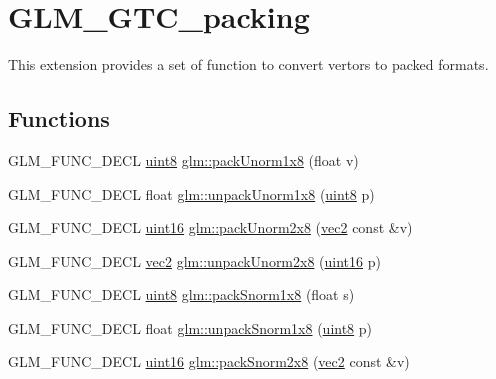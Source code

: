 \hypertarget{group__gtc__packing}{}\section{G\+L\+M\+\_\+\+G\+T\+C\+\_\+packing}
\label{group__gtc__packing}


This extension provides a set of function to convert vertors to packed formats.  


\subsection*{Functions}
\begin{DoxyCompactItemize}
\item 
G\+L\+M\+\_\+\+F\+U\+N\+C\+\_\+\+D\+E\+CL \hyperlink{group__gtc__type__precision_ga1a7dcd8aac97cc8020817c94049deff2}{uint8} \hyperlink{group__gtc__packing_ga2f9963e5d762b10085b280d3662017ba}{glm\+::pack\+Unorm1x8} (float v)
\item 
G\+L\+M\+\_\+\+F\+U\+N\+C\+\_\+\+D\+E\+CL float \hyperlink{group__gtc__packing_ga32f3f2642df2ea87449d59fb614a8305}{glm\+::unpack\+Unorm1x8} (\hyperlink{group__gtc__type__precision_ga1a7dcd8aac97cc8020817c94049deff2}{uint8} p)
\item 
G\+L\+M\+\_\+\+F\+U\+N\+C\+\_\+\+D\+E\+CL \hyperlink{group__gtc__type__precision_gad8c2939e1fdd8e5828b31d95c52255d5}{uint16} \hyperlink{group__gtc__packing_ga833288fc0d4a79f19d0db75a6843bfe6}{glm\+::pack\+Unorm2x8} (\hyperlink{group__core__types_gaa1618f51db67eaa145db101d8c8431d8}{vec2} const \&v)
\item 
G\+L\+M\+\_\+\+F\+U\+N\+C\+\_\+\+D\+E\+CL \hyperlink{group__core__types_gaa1618f51db67eaa145db101d8c8431d8}{vec2} \hyperlink{group__gtc__packing_ga96ce0c24339ee676e28a027fffd1edf6}{glm\+::unpack\+Unorm2x8} (\hyperlink{group__gtc__type__precision_gad8c2939e1fdd8e5828b31d95c52255d5}{uint16} p)
\item 
G\+L\+M\+\_\+\+F\+U\+N\+C\+\_\+\+D\+E\+CL \hyperlink{group__gtc__type__precision_ga1a7dcd8aac97cc8020817c94049deff2}{uint8} \hyperlink{group__gtc__packing_ga26b6cd7a35c46c4b6a342f3b97b47423}{glm\+::pack\+Snorm1x8} (float s)
\item 
G\+L\+M\+\_\+\+F\+U\+N\+C\+\_\+\+D\+E\+CL float \hyperlink{group__gtc__packing_ga6f2bebf536fbf7c8b97d4b306bb3354e}{glm\+::unpack\+Snorm1x8} (\hyperlink{group__gtc__type__precision_ga1a7dcd8aac97cc8020817c94049deff2}{uint8} p)
\item 
G\+L\+M\+\_\+\+F\+U\+N\+C\+\_\+\+D\+E\+CL \hyperlink{group__gtc__type__precision_gad8c2939e1fdd8e5828b31d95c52255d5}{uint16} \hyperlink{group__gtc__packing_ga05d08a82923166ec7cd5d0e6154c9953}{glm\+::pack\+Snorm2x8} (\hyperlink{group__core__types_gaa1618f51db67eaa145db101d8c8431d8}{vec2} const \&v)

\end{DoxyCompactItemize}
